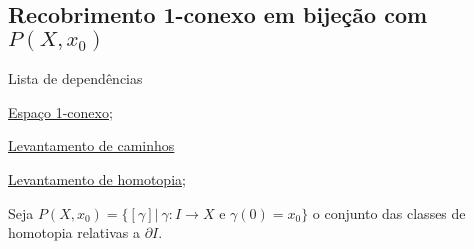 \subsection{Recobrimento 1-conexo em bijeção com $P(X,x_0)$} %
\label{recobrimento-1-conexo-em-bijecao-com-P(X,x)}
\begin{titlemize}{Lista de dependências}
	\item \hyperref[espaço-1-conexo-def]{Espaço 1-conexo};\\ %
    \item \hyperref[levantamento-de-caminhos-prop]{Levantamento de caminhos}\\
	\item \hyperref[levantamento-de-homotopia-prop]{Levantamento de homotopia};\\
\end{titlemize}

Seja $P(X,x_0)=\{[\gamma]|~\gamma:I\rightarrow X \text{ e }\gamma(0)=x_0\}$ o conjunto das classes de homotopia relativas a $\partial I$.

